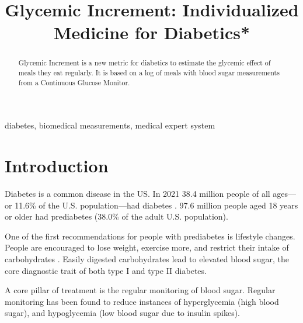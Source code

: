 \documentclass[conference]{IEEEtran}
\begin{document}
\title{Glycemic Increment: Individualized Medicine for Diabetics*\\
}

\author{
\and
{}
}
\maketitle

\begin{abstract}
Glycemic Increment is a new metric for diabetics to estimate the glycemic effect of meals they eat regularly. It is based on a log of meals with blood sugar measurements from a Continuous Glucose Monitor.
\end{abstract}

\begin{IEEEkeywords}
diabetes, biomedical measurements, medical expert system
\end{IEEEkeywords}

\section{Introduction}
Diabetes is a common disease in the US. In 2021 38.4 million people of all ages—or 11.6\% of the U.S. population—had diabetes \cite{CDC_2024}. 97.6 million people aged 18 years or older had prediabetes (38.0\% of the adult U.S. population).

One of the first recommendations for people with prediabetes is lifestyle changes. People are encouraged to lose weight, exercise more, and restrict their intake of carbohydrates \cite{CDC_2024b}. Easily digested carbohydrates lead to elevated blood sugar, the core diagnostic trait of both type I and type II diabetes.

A core pillar of treatment is the regular monitoring of blood sugar. Regular monitoring has been found to reduce instances of hyperglycemia (high blood sugar), and hypoglycemia (low blood sugar due to insulin spikes).
\end{document}
